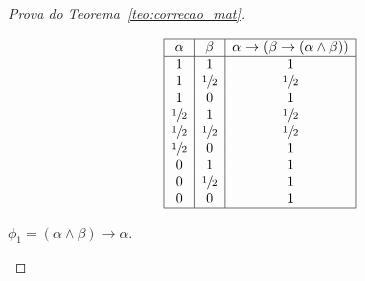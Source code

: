 \begin{proof}[Prova do Teorema~\ref{teo:correcao_mat}]
\begin{provaporcasos}
\begin{provaporsubcasos}
                    \begin{center}
                        \[
                            \begin{array}{|c|c|c|}%
                                \hline%
                                \alpha      & \beta & \alpha \to (\beta \to (\alpha \land \beta)) \\
                                \hline%
                                1&1&               1\\ 
                                1&\meio{}&\meio{}\\
                                1&0&1\\
                                \meio{}&1&\meio{}\\
                                \meio{}&\meio{}&\meio{}\\
                                \meio{}&0&1\\
                                0&1&1\\
                                0&\meio{}&1\\
                                0&0&1\\
                                \hline%
                            \end{array}
                        \]
                    \end{center}

                    

                    \subcasodeprova{} $\phi_{1} = (\alpha \land \beta) \to \alpha$. 



\end{provaporsubcasos}
\end{provaporcasos}
\end{proof}
